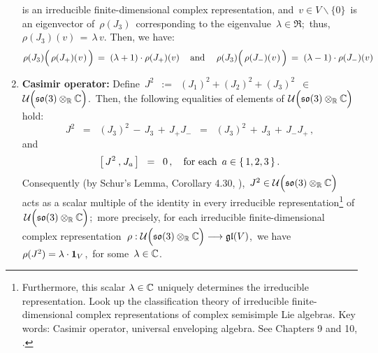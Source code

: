 \begin{proposition}
\begin{enumerate}
	is an irreducible finite-dimensional complex representation, and
	\,$v \in V \backslash\{0\}$\, is an eigenvector of \,$\rho(J_{3})$\,
	corresponding to the eigenvalue \,$\lambda \in \Re$;\, thus, \,$\rho(J_{3})(v) \,=\, \lambda\,v$.
	Then, we have:
	\begin{equation*}
	\rho(J_{3})\!\left(\,\rho(J_{+})(\overset{{\color{white}-}}{v})\,\right) \, = \; (\lambda+1)\cdot\rho(J_{+})(v)\,
	\quad\textnormal{and}\quad\;
	\rho(J_{3})\!\left(\,\rho(J_{-})(\overset{{\color{white}-}}{v})\,\right) \, = \; (\lambda-1)\cdot\rho(J_{-})(v)
	\end{equation*}
\item
	\textbf{Casimir operator:}\;\;
	Define
	\,$J^{2}$
	\,$:=$\,
	$(J_{1})^{2} + (J_{2})^{2} + (J_{3})^{2}$
	\,$\in$\
	 $\mathcal{U}\!\left(\mathfrak{so}(3) \overset{{\color{white}.}}{\otimes_{\Re}} \C\right)$.\,
	Then, the following equalities of elements of
	\;$\mathcal{U}\!\left(\mathfrak{so}(3) \overset{{\color{white}.}}{\otimes_{\Re}} \C\right)$
	hold:
	\begin{equation*}
	J^{2}
	\;\; =\;\;
		(J_{3})^{2} \,-\, J_{3} \,+\, J_{+}J_{-}
	\;\; =\;\;
		(J_{3})^{2} \,+\, J_{3} \,+\, J_{-}J_{+}\,,
	\end{equation*}
	and
	\begin{equation*}
	\left[\,J^{2}\,\overset{{\color{white}1}}{,}\,J_{a}\,\right]
	\;\; = \;\;
		0\,,
	\quad
	\textnormal{for each \,$a \in \{\,1,2,3\,\}$}\,.
	\end{equation*}
	Consequently (by Schur's Lemma, Corollary 4.30, \cite{Hall2015}), 
	\,$J^{2} \in \mathcal{U}\!\left(\mathfrak{so}(3) \overset{{\color{white}.}}{\otimes_{\Re}} \C\right)$\,
	acts as a scalar multiple of the identity in every irreducible
	representation\footnote{Furthermore, this scalar $\lambda \in \mathbb{C}$ uniquely determines
	the irreducible representation.
	Look up the classification theory of irreducible finite-dimensional complex representations
	of complex semisimple Lie algebras.
	Key words: Casimir operator, universal enveloping algebra. See Chapters 9 and 10, \cite{Hall2015}.}
	of \,$\mathcal{U}\!\left(\mathfrak{so}(3) \overset{{\color{white}.}}{\otimes_{\Re}} \C\right)$;\,
	more precisely, for each irreducible finite-dimensional complex representation
	\,$\rho : \mathcal{U}\!\left(\mathfrak{so}(3) \overset{{\color{white}.}}{\otimes_{\Re}} \C\right) \longrightarrow \mathfrak{gl}(V)$,\,
	we have \,$\rho(J^{2}) = \lambda \cdot \textnormal{\textbf{1}}_{V}$,\,
	for some \,$\lambda \in \mathbb{C}$.
\end{enumerate}
\end{proposition}

